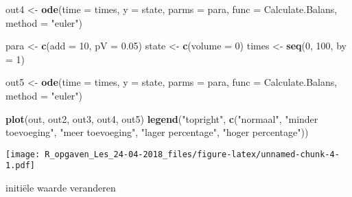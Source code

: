 \documentclass[]{article}
\newenvironment{Shaded}{\begin{snugshade}}{\end{snugshade}}
\newcommand{\KeywordTok}[1]{\textcolor[rgb]{0.13,0.29,0.53}{\textbf{#1}}}
\newcommand{\DataTypeTok}[1]{\textcolor[rgb]{0.13,0.29,0.53}{#1}}
\newcommand{\DecValTok}[1]{\textcolor[rgb]{0.00,0.00,0.81}{#1}}
\newcommand{\FloatTok}[1]{\textcolor[rgb]{0.00,0.00,0.81}{#1}}
\newcommand{\StringTok}[1]{\textcolor[rgb]{0.31,0.60,0.02}{#1}}
\newcommand{\NormalTok}[1]{#1}
\begin{document}
\begin{Shaded}
\begin{Highlighting}[]
\NormalTok{out4 <-}\StringTok{ }\KeywordTok{ode}\NormalTok{(}\DataTypeTok{time =}\NormalTok{ times,}
           \DataTypeTok{y =}\NormalTok{ state,}
           \DataTypeTok{parms =}\NormalTok{ para,}
           \DataTypeTok{func =}\NormalTok{ Calculate.Balans,}
           \DataTypeTok{method =} \StringTok{"euler"}\NormalTok{)}

\NormalTok{para <-}\StringTok{ }\KeywordTok{c}\NormalTok{(}\DataTypeTok{add =} \DecValTok{10}\NormalTok{, }\DataTypeTok{pV =} \FloatTok{0.05}\NormalTok{)}
\NormalTok{state <-}\StringTok{ }\KeywordTok{c}\NormalTok{(}\DataTypeTok{volume =} \DecValTok{0}\NormalTok{)}
\NormalTok{times <-}\StringTok{ }\KeywordTok{seq}\NormalTok{(}\DecValTok{0}\NormalTok{, }\DecValTok{100}\NormalTok{,  }\DataTypeTok{by =} \DecValTok{1}\NormalTok{)}

\NormalTok{out5 <-}\StringTok{ }\KeywordTok{ode}\NormalTok{(}\DataTypeTok{time =}\NormalTok{ times,}
           \DataTypeTok{y =}\NormalTok{ state,}
           \DataTypeTok{parms =}\NormalTok{ para,}
           \DataTypeTok{func =}\NormalTok{ Calculate.Balans,}
           \DataTypeTok{method =} \StringTok{"euler"}\NormalTok{)}
\end{Highlighting}
\end{Shaded}

\begin{Shaded}
\begin{Highlighting}[]
\KeywordTok{plot}\NormalTok{(out, out2, out3, out4, out5)}
\KeywordTok{legend}\NormalTok{(}\StringTok{"topright"}\NormalTok{,}
       \KeywordTok{c}\NormalTok{(}\StringTok{"normaal"}\NormalTok{, }\StringTok{"minder toevoeging"}\NormalTok{, }
         \StringTok{"meer toevoeging"}\NormalTok{, }\StringTok{"lager percentage"}\NormalTok{, }\StringTok{"hoger percentage"}\NormalTok{))}
\end{Highlighting}
\end{Shaded}

\texttt{[image: R\_opgaven\_Les\_24-04-2018\_files/figure-latex/unnamed-chunk-4-1.pdf]}

initiële waarde veranderen
\end{document}
